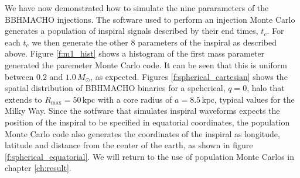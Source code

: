 We have now demonstrated how to simulate the nine pararameters of the BBHMACHO
injections. The software used to perform an injection Monte Carlo generates a
population of inspiral signals described by their end times, $t_c$. For each
$t_c$ we then generate the other 8 parameters of the inspiral as described
above. Figure \ref{f:m1_hist} shows a histogram of the first mass parameter 
generated the paremeter Monte Carlo code. It can be seen that this is uniform
between $0.2$ and $1.0\,M_\odot$, as expected. Figures
\ref{f:spherical_cartesian} shows the spatial distribution of BBHMACHO
binaries for a speherical, $q=0$, halo that extends to $R_\mathrm{max} =
50\,\mathrm{kpc}$ with a core radius of $a = 8.5\,\mathrm{kpc}$, typical
values for the Milky Way. Since the sotfware that simulates inspiral waveforms
expects the position of the inspiral to be specified in equatorial
coordinates, the population Monte Carlo code also generates the coordinates of
the inspiral as longitude, latitude and distance from the center of the
earth, as shown in figure \ref{f:spherical_equatorial}.  We will return to the
use of population Monte Carlos in chapter \ref{ch:result}.

\newpage

